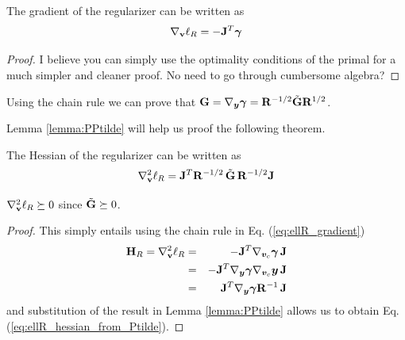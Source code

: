 
\begin{theorem}
	The gradient of the regularizer can be written as
	\begin{equation}
		\nabla_\mf{v}\ell_R = -\mf{J}^T\bgamma
		\label{eq:ellR_gradient}
	\end{equation}
\end{theorem}
\begin{proof}
	I believe you can simply use the optimality conditions of the primal for a
	much simpler and cleaner proof. No need to go through cumbersome
	algebra?
\end{proof}

\begin{lemma}
	Using the chain rule we can prove that ${\mathbf{G}} = \nabla_{{\bm{y}}}{\bm\gamma} =
	{\mathbf{R}}^{-1/2}\tilde{{\mathbf{G}}}{\mathbf{R}}^{1/2}$.
	\label{lemma:PPtilde}
\end{lemma}


Lemma \ref{lemma:PPtilde} will help us proof the following theorem.
\begin{theorem}
	The Hessian of the regularizer can be written as
	\begin{equation}
		\nabla_\mf{v}^2\ell_R = \sJT\ssqrtRinv\,\sGtilde\,\ssqrtRinv\sJ
		\label{eq:ellR_hessian_from_Ptilde}
	\end{equation}
\end{theorem}
\begin{corollary}
	$\nabla_{\mathbf{v}}^2\ell_R\succeq 0 $ since $\tilde{{\mathbf{G}}} \succeq 0$.
\end{corollary}
\begin{proof}
This simply entails using the chain rule in Eq. (\ref{eq:ellR_gradient}) 
\begin{eqnarray}
	{\mathbf{H}}_R = \nabla_{\mathbf{v}}^2\ell_R &=& -{\mathbf{J}}^T
	\nabla_{{\bm{v}}_c}{\bm\gamma}\,{\mathbf{J}}\nonumber\\
	&=&-{\mathbf{J}}^T \nabla_{{\bm{y}}}{\bm\gamma}\nabla_{{\bm{v}}_c}{\bm{y}}\,{\mathbf{J}}\nonumber\\
	&=&{\mathbf{J}}^T \nabla_{{\bm{y}}}{\bm\gamma}{\mathbf{R}}^{-1}\,{\mathbf{J}}
\end{eqnarray}
and substitution of the result in Lemma \ref{lemma:PPtilde} allows us to obtain
 Eq. (\ref{eq:ellR_hessian_from_Ptilde}).
\end{proof} 

